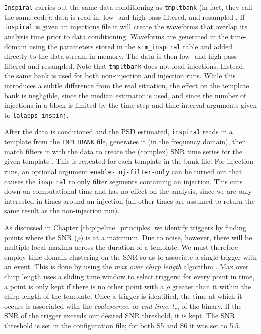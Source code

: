 \texttt{Inspiral} carries out the same data conditioning as \texttt{tmpltbank}
(in fact, they call the same code): data is read in, low- and high-pass
filtered, and resampled \cite{brown-2005-22, Allen:2005fk}. If
\texttt{inspiral} is given an injections file it will create the waveforms that
overlap its analysis time prior to data conditioning. Waveforms are generated
in the time-domain using the parameters stored in the \texttt{sim\_inspiral}
table and added directly to the data stream in memory. The data is then low-
and high-pass filtered and resampled. Note that \texttt{tmpltbank} does not
load injections. Instead, the same bank is used for both non-injection and
injection runs. While this introduces a subtle difference from the real
situation, the effect on the template bank is negligible, since the median
estimator is used, and since the number of injections in a block is limited by
the time-step and time-interval arguments given to \texttt{lalapps\_inspinj}.

After the data is conditioned and the \ac{PSD} estimated, \texttt{inspiral}
reads in a template from the \texttt{TMPLTBANK} file, generates it (in the
frequency domain), then match filters it with the data to create the (complex)
\ac{SNR} time series for the given template \cite{brown-2005-22, Allen:2005fk}.
This is repeated for each template in the bank file. For injection runs, an
optional argument \texttt{enable-inj-filter-only} can be turned out that causes
the \texttt{inspiral} to only filter segments containing an injection. This
cuts down on computational time and has no effect on the analysis, since we are
only interested in times around an injection (all other times are assumed to
return the same result as the non-injection run).

As discussed in Chapter \ref{ch:pipeline_principles} we identify triggers by
finding points where the \ac{SNR} ($\rho$) is at a maximum. Due to noise,
however, there will be multiple local maxima across the duration of a template.
We must therefore employ time-domain clustering on the \ac{SNR} so as to
associate a single trigger with an event. This is done by using the \emph{max
over chirp length} algorithm \cite{Brown}. Max over chirp length uses a sliding
time window to select triggers: for every point in time, a point is only kept
if there is no other point with a $\rho$ greater than it within the chirp
length of the template. Once a trigger is identified, the time at which it
occurs is associated with the \emph{coalescence}, or \emph{end-time}, $t_c$, of
the binary. If the \ac{SNR} of the trigger exceeds our desired \ac{SNR}
threshold, it is kept. The \ac{SNR} threshold is set in the configuration file;
for both \ac{S5} and \ac{S6} it was set to 5.5.

